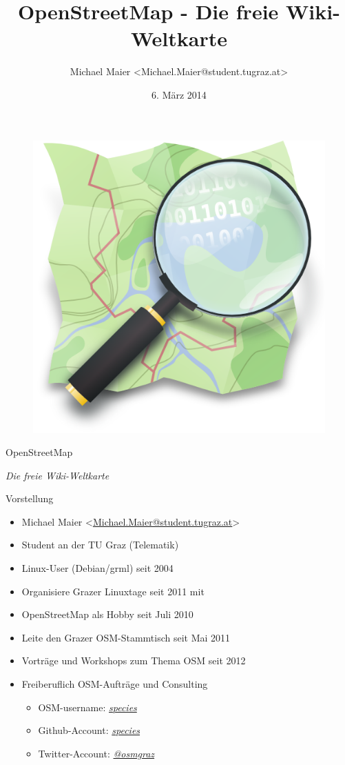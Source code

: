 \documentclass{beamer}
\title{OpenStreetMap - Die freie Wiki-Weltkarte}
\author{Michael Maier \textless Michael.Maier@student.tugraz.at\textgreater}
\date{6. März 2014}
\begin{document}

\begin{frame} 


\begin{figure}
  \centering
  \includegraphics[width=.5\textwidth]{mag_map.png}
\end{figure}

\begin{center}
\Huge{OpenStreetMap\\}
\end{center}

\begin{center}
\Large{\emph{Die freie Wiki-Weltkarte}}
\end{center}

\end{frame}


\begin{frame}{Vorstellung}

  \begin{itemize}
    \item Michael Maier \textless \href{mailto:Michael.Maier@student.tugraz.at}{Michael.Maier@student.tugraz.at}\textgreater
    \item Student an der TU Graz (Telematik)
\vspace{0.3cm}
    \item Linux-User (Debian/grml) seit 2004
    \item Organisiere Grazer Linuxtage seit 2011 mit
    \item OpenStreetMap als Hobby seit Juli 2010
    \item Leite den Grazer OSM-Stammtisch seit Mai 2011
\vspace{0.3cm}
    \item Vorträge und Workshops zum Thema OSM seit 2012
    \item Freiberuflich OSM-Aufträge und Consulting
    \begin{itemize}
      \item OSM-username: \emph{\href{http://www.openstreetmap.org/user/species}{species}}
      \item Github-Account: \emph{\href{https://github.com/species}{species}}
      \item Twitter-Account: \emph{\href{https://twitter.com/osmgraz}{@osmgraz}}
    \end{itemize}
  \end{itemize}
\end{frame}
\end{document}
